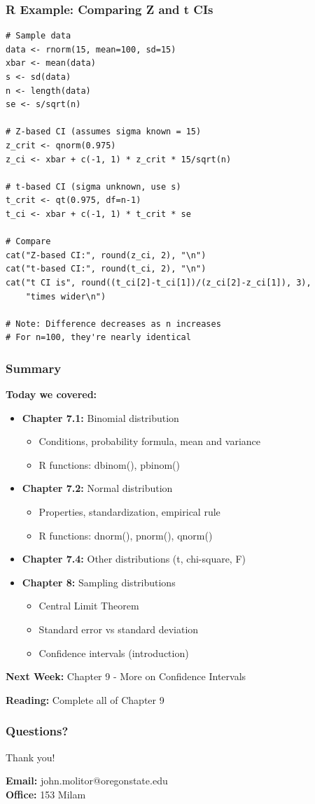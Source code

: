 \documentclass{beamer}
\begin{document}
\begin{frame}[fragile]
\frametitle{R Example: Comparing Z and t CIs}
\footnotesize
\begin{verbatim}
# Sample data
data <- rnorm(15, mean=100, sd=15)
xbar <- mean(data)
s <- sd(data)
n <- length(data)
se <- s/sqrt(n)

# Z-based CI (assumes sigma known = 15)
z_crit <- qnorm(0.975)
z_ci <- xbar + c(-1, 1) * z_crit * 15/sqrt(n)

# t-based CI (sigma unknown, use s)
t_crit <- qt(0.975, df=n-1)
t_ci <- xbar + c(-1, 1) * t_crit * se

# Compare
cat("Z-based CI:", round(z_ci, 2), "\n")
cat("t-based CI:", round(t_ci, 2), "\n")
cat("t CI is", round((t_ci[2]-t_ci[1])/(z_ci[2]-z_ci[1]), 3),
    "times wider\n")

# Note: Difference decreases as n increases
# For n=100, they're nearly identical
\end{verbatim}
\end{frame}

\begin{frame}
\frametitle{Summary}
\textbf{Today we covered:}
\begin{itemize}
\item \textbf{Chapter 7.1:} Binomial distribution
  \begin{itemize}
  \item Conditions, probability formula, mean and variance
  \item R functions: dbinom(), pbinom()
  \end{itemize}
\item \textbf{Chapter 7.2:} Normal distribution
  \begin{itemize}
  \item Properties, standardization, empirical rule
  \item R functions: dnorm(), pnorm(), qnorm()
  \end{itemize}
\item \textbf{Chapter 7.4:} Other distributions (t, chi-square, F)
\item \textbf{Chapter 8:} Sampling distributions
  \begin{itemize}
  \item Central Limit Theorem
  \item Standard error vs standard deviation
  \item Confidence intervals (introduction)
  \end{itemize}
\end{itemize}

\vspace{0.5cm}
\textbf{Next Week:} Chapter 9 - More on Confidence Intervals

\vspace{0.3cm}
\textbf{Reading:} Complete all of Chapter 9
\end{frame}

\begin{frame}
\frametitle{Questions?}
\begin{center}
\Large{Thank you!}

\vspace{1cm}

\textbf{Email:} john.molitor@oregonstate.edu\\
\textbf{Office:} 153 Milam
\end{center}
\end{frame}
\end{document}
